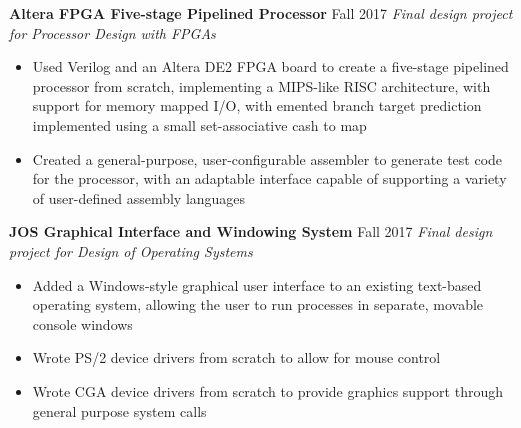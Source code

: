 \begin{samepage}
\textbf{Altera FPGA Five-stage Pipelined Processor}
\hfill
Fall 2017
\newline
\textit{Final design project for Processor Design with FPGAs}
\begin{itemize}[noitemsep,topsep=0pt,parsep=0pt,partopsep=0pt]
    \item Used Verilog and an Altera DE2 FPGA board to create a five-stage pipelined processor from scratch, implementing a MIPS-like RISC architecture, with support for memory mapped I/O, with emented branch target prediction implemented using a small set-associative cash to map
    \item Created a general-purpose, user-configurable assembler to generate test code for the processor, with an adaptable interface capable of supporting a variety of user-defined assembly languages
\end{itemize}
\end{samepage}
\smallskip

\begin{samepage}
\textbf{JOS Graphical Interface and Windowing System}
\hfill
Fall 2017
\newline
\textit{Final design project for Design of Operating Systems}
\begin{itemize}[noitemsep,topsep=0pt,parsep=0pt,partopsep=0pt]
    \item Added a Windows-style graphical user interface to an existing text-based operating system, allowing the user to run processes in separate, movable console windows
    \item Wrote PS/2 device drivers from scratch to allow for mouse control
    \item Wrote CGA device drivers from scratch to provide graphics support through general purpose system calls
\end{itemize}
\end{samepage}
\smallskip
